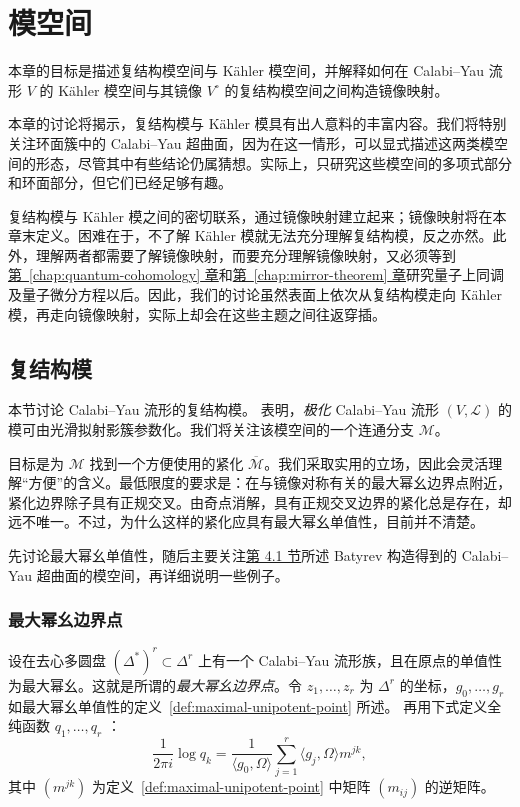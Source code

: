 \chapter{模空间}\label{chap:moduli}
本章的目标是描述复结构模空间与 Kähler 模空间，并解释如何在 Calabi--Yau 流形 $V$ 的 Kähler 模空间与其镜像 $V^\circ$ 的复结构模空间之间构造镜像映射。

本章的讨论将揭示，复结构模与 Kähler 模具有出人意料的丰富内容。我们将特别关注环面簇中的 Calabi--Yau 超曲面，因为在这一情形，可以显式描述这两类模空间的形态，尽管其中有些结论仍属猜想。实际上，只研究这些模空间的多项式部分和环面部分，但它们已经足够有趣。

复结构模与 Kähler 模之间的密切联系，通过镜像映射建立起来；镜像映射将在本章末定义。困难在于，不了解 Kähler 模就无法充分理解复结构模，反之亦然。此外，理解两者都需要了解镜像映射，而要充分理解镜像映射，又必须等到\hyperref[chap:quantum-cohomology]{第~\ref*{chap:quantum-cohomology} 章}和\hyperref[chap:mirror-theorem]{第~\ref*{chap:mirror-theorem} 章}研究量子上同调及量子微分方程以后。因此，我们的讨论虽然表面上依次从复结构模走向 Kähler 模，再走向镜像映射，实际上却会在这些主题之间往返穿插。

\section{复结构模}\label{sec:complex-moduli}
本节讨论 Calabi--Yau 流形的复结构模。 表明，\emph{极化} Calabi--Yau 流形 $(V,\mathcal L)$ 的模可由光滑拟射影簇参数化。我们将关注该模空间的一个连通分支 $\mathcal M$。

目标是为 $\mathcal M$ 找到一个方便使用的紧化 $\overline{\mathcal M}$。我们采取实用的立场，因此会灵活理解“方便”的含义。最低限度的要求是：在与镜像对称有关的最大幂幺边界点附近，紧化边界除子具有正规交叉。由奇点消解，具有正规交叉边界的紧化总是存在，却远不唯一。不过，为什么这样的紧化应具有最大幂幺单值性，目前并不清楚。

先讨论最大幂幺单值性，随后主要关注\hyperref[sec:batyrev-mirror]{第 4.1 节}所述 Batyrev 构造得到的 Calabi--Yau 超曲面的模空间，再详细说明一些例子。

\subsection{最大幂幺边界点}\label{subsec:mum-boundary-points}
设在去心多圆盘 $(\Delta^*)^r\subset\Delta^r$ 上有一个 Calabi--Yau 流形族，且在原点的单值性为最大幂幺。这就是所谓的\emph{最大幂幺边界点}。令 $z_1,\ldots,z_r$ 为 $\Delta^r$ 的坐标，$g_0,\ldots,g_r$ 如最大幂幺单值性的定义~\ref{def:maximal-unipotent-point} 所述。
再用下式定义全纯函数 $q_1,\ldots,q_r$ ：
\begin{equation}\label{eq:mum-canonical-coordinates}
\frac1{2\pi i}\log q_k=\frac1{\langle g_0,\Omega\rangle}
\sum_{j=1}^r\langle g_j,\Omega\rangle m^{jk},
\end{equation}
其中 $(m^{jk})$ 为定义~\ref{def:maximal-unipotent-point} 中矩阵 $(m_{ij})$ 的逆矩阵。

